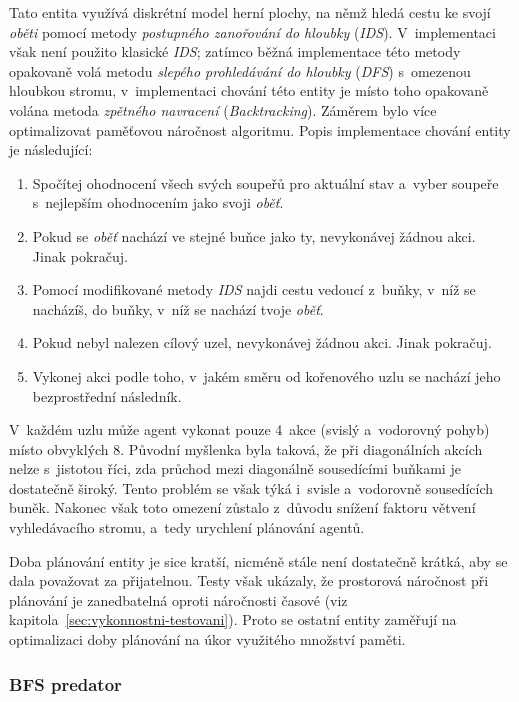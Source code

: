 Tato entita využívá diskrétní model herní plochy, na němž hledá cestu ke svojí \emph{oběti} pomocí metody \emph{postupného zanořování do hloubky} (\emph{IDS}). V~implementaci však není použito klasické \emph{IDS}; zatímco běžná implementace této metody opakovaně volá metodu \emph{slepého prohledávání do hloubky} (\emph{DFS}) s~omezenou hloubkou stromu, v~implementaci chování této entity je místo toho opakovaně volána metoda \emph{zpětného navracení} (\emph{Backtracking}). Záměrem bylo více optimalizovat paměťovou náročnost algoritmu. Popis implementace chování entity je následující:
\begin{enumerate}
    \item Spočítej ohodnocení všech svých soupeřů pro aktuální stav a~vyber soupeře s~nejlepším ohodnocením jako svoji \emph{oběť}.
    \item Pokud se \emph{oběť} nachází ve stejné buňce jako ty, nevykonávej žádnou akci. Jinak pokračuj.
    \item Pomocí modifikované metody \emph{IDS} najdi cestu vedoucí z~buňky, v~níž se nacházíš, do buňky, v~níž se nachází tvoje \emph{oběť}.
    \item Pokud nebyl nalezen cílový uzel, nevykonávej žádnou akci. Jinak pokračuj.
    \item Vykonej akci podle toho, v~jakém směru od kořenového uzlu se nachází jeho bezprostřední následník.
\end{enumerate}

V~každém uzlu může agent vykonat pouze 4~akce (svislý a~vodorovný pohyb) místo obvyklých 8. Původní myšlenka byla taková, že při diagonálních akcích nelze s~jistotou říci, zda průchod mezi diagonálně sousedícími buňkami je dostatečně široký. Tento problém se však týká i~svisle a~vodorovně sousedících buněk. Nakonec však toto omezení zůstalo z~důvodu snížení faktoru větvení vyhledávacího stromu, a~tedy urychlení plánování agentů.

Doba plánování entity je sice kratší, nicméně stále není dostatečně krátká, aby se dala považovat za přijatelnou. Testy však ukázaly, že prostorová náročnost při plánování je zanedbatelná oproti náročnosti časové (viz kapitola~\ref{sec:vykonnostni-testovani}). Proto se ostatní entity zaměřují na optimalizaci doby plánování na úkor využitého množství paměti.

\subsubsection*{BFS predator}


